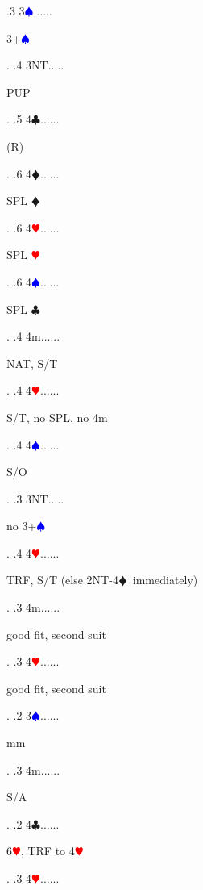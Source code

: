 \documentclass[a4paper]{article}
\newcommand{\BC}{\textcolor{OliveGreen}{$\clubsuit$}}
\newcommand{\BD}{\textcolor{RedOrange}{$\vardiamondsuit$}}
\newcommand{\BH}{\textcolor{Red}{$\varheartsuit${}}}
\newcommand{\BS}{\textcolor{Blue}{$\spadesuit${}}}
\begin{document}
{ .3 3\BS......\begin{minipage}[t]{0.8\textwidth}
3+\BS 
\end{minipage}. 
 .4 3NT.....\begin{minipage}[t]{0.8\textwidth}
PUP
\end{minipage}. 
 .5 4\BC......\begin{minipage}[t]{0.8\textwidth}
(R)
\end{minipage}. 
 .6 4\BD......\begin{minipage}[t]{0.8\textwidth}
SPL \BD 
\end{minipage}. 
 .6 4\BH......\begin{minipage}[t]{0.8\textwidth}
SPL \BH 
\end{minipage}. 
 .6 4\BS......\begin{minipage}[t]{0.8\textwidth}
SPL \BC 
\end{minipage}. 
 .4 4m......\begin{minipage}[t]{0.8\textwidth}
NAT, S/T
\end{minipage}. 
 .4 4\BH......\begin{minipage}[t]{0.8\textwidth}
S/T, no SPL, no 4m
\end{minipage}. 
 .4 4\BS......\begin{minipage}[t]{0.8\textwidth}
S/O
\end{minipage}. 
 .3 3NT.....\begin{minipage}[t]{0.8\textwidth}
no 3+\BS 
\end{minipage}. 
 .4 4\BH......\begin{minipage}[t]{0.8\textwidth}
TRF, S/T (else 2NT-4\BD\ immediately)
\end{minipage}. 
 .3 4m......\begin{minipage}[t]{0.8\textwidth}
good fit, second suit
\end{minipage}. 
 .3 4\BH......\begin{minipage}[t]{0.8\textwidth}
good fit, second suit
\end{minipage}. 
 .2 3\BS......\begin{minipage}[t]{0.8\textwidth}
mm
\end{minipage}. 
 .3 4m......\begin{minipage}[t]{0.8\textwidth}
S/A
\end{minipage}. 
 .2 4\BC......\begin{minipage}[t]{0.8\textwidth}
6\BH , TRF to 4\BH 
\end{minipage}. 
 .3 4\BH......\begin{minipage}[t]{0.8\textwidth}

\end{minipage}}
\end{document}
